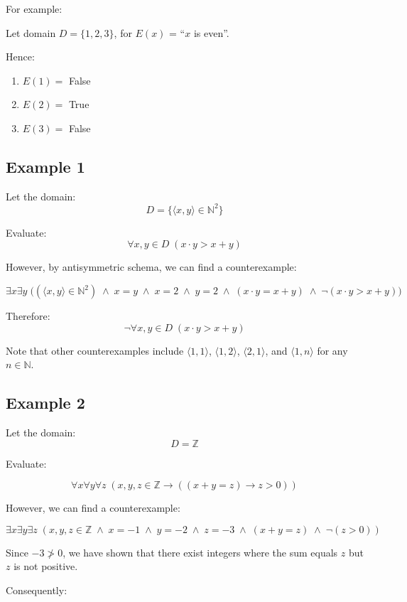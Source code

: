 \documentclass[12pt,a4paper,openany]{article}
\begin{document}
For example:

Let domain \(D = \{1,2,3\}\), for \(E(x)\) = ``\(x\) is even''.

Hence:

\begin{enumerate}
  \item \(E(1) =\) False
  \item \(E(2) =\) True
  \item \(E(3) =\) False
\end{enumerate}


\subsection{Example 1}\label{example-1}

Let the domain: \[D = \{\langle x,y \rangle \in \mathbb{N}^2\}\]

Evaluate: \[\forall x,y  \in D \;(x \cdot y > x + y)\]

However, by antisymmetric schema, we can find a counterexample:

\[
\exists x \exists y \;\big((\langle x, y \rangle \in \mathbb{N}^2) \;\land\; x = y \;\land\; x = 2 \;\land\; y = 2 \;\land\; (x \cdot y = x + y) \;\land\; \neg(x \cdot y > x + y)\big)
\]

Therefore: \[\boxed{\neg \forall x,y \in D \;(x \cdot y > x + y)}\]

Note that other counterexamples include \(\langle 1,1 \rangle\),
\(\langle 1,2 \rangle\), \(\langle 2,1 \rangle\), and
\(\langle 1,n \rangle\) for any \(n \in \mathbb{N}\).

\subsection{Example 2}\label{example-2}

Let the domain: \[D = \mathbb{Z}\]

Evaluate:

\[\forall x \forall y \forall z \;(x, y, z \in \mathbb{Z} \to ((x + y = z) \to z > 0))\]

However, we can find a counterexample:

\[\exists x \exists y \exists z \;(x, y, z \in \mathbb{Z} \;\land\; x = -1 \;\land\; y = -2 \;\land\; z = -3 \;\land\; (x + y = z) \;\land\; \neg(z > 0))\]

Since \(-3 \not> 0\), we have shown that there exist integers where the
sum equals \(z\) but \(z\) is not positive.

Consequently:
\end{document}

